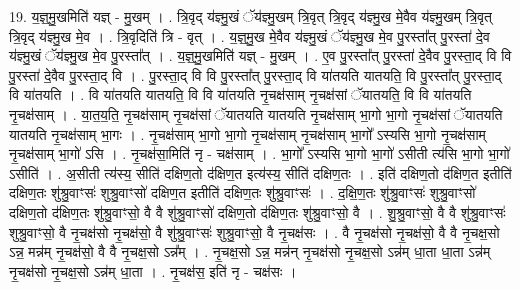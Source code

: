 \documentclass[17pt]{extarticle}
\begin{document}
19. य॒ज्ञ्॒मु॒खमिति॑ यज्ञ् - मु॒खम् । . त्रि॒वृद् य॑ज्ञ्मु॒खं ॅय॑ज्ञ्मु॒खम् त्रि॒वृत् त्रि॒वृद् य॑ज्ञ्मु॒ख मे॒वैव य॑ज्ञ्मु॒खम् त्रि॒वृत् त्रि॒वृद् य॑ज्ञ्मु॒ख मे॒व । . त्रि॒वृदिति॑ त्रि - वृत् । . य॒ज्ञ्॒मु॒ख मे॒वैव य॑ज्ञ्मु॒खं ॅय॑ज्ञ्मु॒ख मे॒व पु॒रस्ता᳚त् पु॒रस्ता॑ दे॒व य॑ज्ञ्मु॒खं ॅय॑ज्ञ्मु॒ख मे॒व पु॒रस्ता᳚त् । . य॒ज्ञ्॒मु॒खमिति॑ यज्ञ् - मु॒खम् । . ए॒व पु॒रस्ता᳚त् पु॒रस्ता॑ दे॒वैव पु॒रस्ता॒द् वि वि पु॒रस्ता॑ दे॒वैव पु॒रस्ता॒द् वि । . पु॒रस्ता॒द् वि वि पु॒रस्ता᳚त् पु॒रस्ता॒द् वि या॑तयति यातयति॒ वि पु॒रस्ता᳚त् पु॒रस्ता॒द् वि या॑तयति । . वि या॑तयति यातयति॒ वि वि या॑तयति नृ॒चक्ष॑साम् नृ॒चक्ष॑सां ॅयातयति॒ वि वि या॑तयति नृ॒चक्ष॑साम् । . या॒त॒य॒ति॒ नृ॒चक्ष॑साम् नृ॒चक्ष॑सां ॅयातयति यातयति नृ॒चक्ष॑साम् भा॒गो भा॒गो नृ॒चक्ष॑सां ॅयातयति यातयति नृ॒चक्ष॑साम् भा॒गः । . नृ॒चक्ष॑साम् भा॒गो भा॒गो नृ॒चक्ष॑साम् नृ॒चक्ष॑साम् भा॒गो᳚ ऽस्यसि भा॒गो नृ॒चक्ष॑साम् नृ॒चक्ष॑साम् भा॒गो॑ ऽसि । . नृ॒चक्ष॑सा॒मिति॑ नृ - चक्ष॑साम् । . भा॒गो᳚ ऽस्यसि भा॒गो भा॒गो॑ ऽसीती त्य॑सि भा॒गो भा॒गो॑ ऽसीति॑ । . अ॒सीती त्य॑स्य॒ सीति॑ दक्षिण॒तो द॑क्षिण॒त इत्य॑स्य॒ सीति॑ दक्षिण॒तः । . इति॑ दक्षिण॒तो द॑क्षिण॒त इतीति॑ दक्षिण॒तः शु॑श्रु॒वाꣳसः॑ शुश्रु॒वाꣳसो॑ दक्षिण॒त इतीति॑ दक्षिण॒तः शु॑श्रु॒वाꣳसः॑ । . द॒क्षि॒ण॒तः शु॑श्रु॒वाꣳसः॑ शुश्रु॒वाꣳसो॑ दक्षिण॒तो द॑क्षिण॒तः शु॑श्रु॒वाꣳसो॒ वै वै शु॑श्रु॒वाꣳसो॑ दक्षिण॒तो द॑क्षिण॒तः शु॑श्रु॒वाꣳसो॒ वै । . शु॒श्रु॒वाꣳसो॒ वै वै शु॑श्रु॒वाꣳसः॑ शुश्रु॒वाꣳसो॒ वै नृ॒चक्ष॑सो नृ॒चक्ष॑सो॒ वै शु॑श्रु॒वाꣳसः॑ शुश्रु॒वाꣳसो॒ वै नृ॒चक्ष॑सः । . वै नृ॒चक्ष॑सो नृ॒चक्ष॑सो॒ वै वै नृ॒चक्ष॒सो ऽन्न॒ मन्न॑म् नृ॒चक्ष॑सो॒ वै वै नृ॒चक्ष॒सो ऽन्न᳚म् । . नृ॒चक्ष॒सो ऽन्न॒ मन्न॑न् नृ॒चक्ष॑सो नृ॒चक्ष॒सो ऽन्न॑म् धा॒ता धा॒ता ऽन्न॑म् नृ॒चक्ष॑सो नृ॒चक्ष॒सो ऽन्न॑म् धा॒ता । . नृ॒चक्ष॑स॒ इति॑ नृ - चक्ष॑सः । \newline
\end{document}
